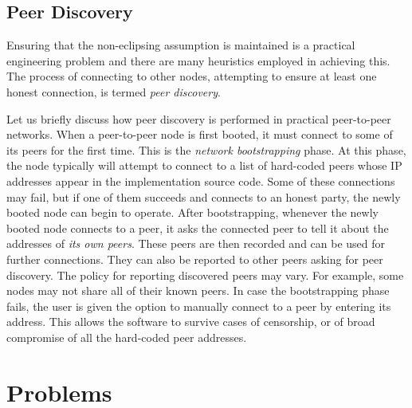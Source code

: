 \subsection*{Peer Discovery}

Ensuring that the non-eclipsing assumption is maintained is a practical engineering problem and
there are many heuristics employed in achieving this. The process of connecting to other nodes,
attempting to ensure at least one honest connection, is termed \emph{peer discovery}.

Let us briefly discuss how peer discovery is performed in practical peer-to-peer
networks. When a peer-to-peer node is first booted, it must connect to some of its peers for the
first time. This is the \emph{network bootstrapping} phase. At this phase, the node typically
will attempt to connect to a list of hard-coded peers whose IP addresses appear in the implementation
source code. Some of these connections may fail, but if one of them succeeds and connects to an honest
party, the newly booted node can begin to operate. After bootstrapping, whenever the newly booted node connects
to a peer, it asks the connected peer to tell it about the addresses of \emph{its own peers}. These
peers are then recorded and can be used for further connections. They can also be reported to other
peers asking for peer discovery. The policy for reporting discovered peers may vary. For example,
some nodes may not share all of their known peers. In case the bootstrapping phase fails, the user
is given the option to manually connect to a peer by entering its address. This allows the software
to survive cases of censorship, or of broad compromise of all the hard-coded peer addresses.

\section*{Problems}

